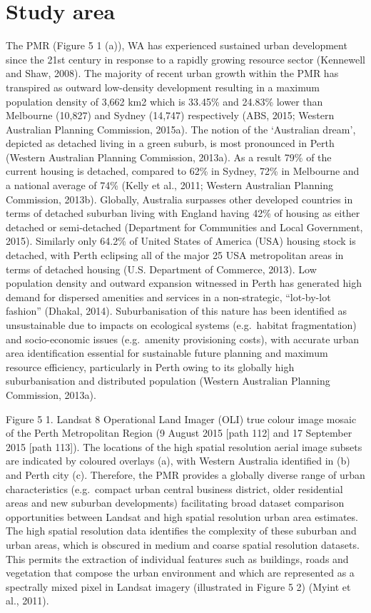 \documentclass[]{book}
\begin{document}
\section{Study area}\label{study-area}

The PMR (Figure 5 1 (a)), WA has experienced sustained urban development
since the 21st century in response to a rapidly growing resource sector
(Kennewell and Shaw, 2008). The majority of recent urban growth within
the PMR has transpired as outward low-density development resulting in a
maximum population density of 3,662 km2 which is 33.45\% and 24.83\%
lower than Melbourne (10,827) and Sydney (14,747) respectively (ABS,
2015; Western Australian Planning Commission, 2015a). The notion of the
`Australian dream', depicted as detached living in a green suburb, is
most pronounced in Perth (Western Australian Planning Commission,
2013a). As a result 79\% of the current housing is detached, compared to
62\% in Sydney, 72\% in Melbourne and a national average of 74\% (Kelly
et al., 2011; Western Australian Planning Commission, 2013b). Globally,
Australia surpasses other developed countries in terms of detached
suburban living with England having 42\% of housing as either detached
or semi-detached (Department for Communities and Local Government,
2015). Similarly only 64.2\% of United States of America (USA) housing
stock is detached, with Perth eclipsing all of the major 25 USA
metropolitan areas in terms of detached housing (U.S. Department of
Commerce, 2013). Low population density and outward expansion witnessed
in Perth has generated high demand for dispersed amenities and services
in a non-strategic, ``lot-by-lot fashion'' (Dhakal, 2014).
Suburbanisation of this nature has been identified as unsustainable due
to impacts on ecological systems (e.g.~habitat fragmentation) and
socio-economic issues (e.g.~amenity provisioning costs), with accurate
urban area identification essential for sustainable future planning and
maximum resource efficiency, particularly in Perth owing to its globally
high suburbanisation and distributed population (Western Australian
Planning Commission, 2013a).

Figure 5 1. Landsat 8 Operational Land Imager (OLI) true colour image
mosaic of the Perth Metropolitan Region (9 August 2015 {[}path 112{]}
and 17 September 2015 {[}path 113{]}). The locations of the high spatial
resolution aerial image subsets are indicated by coloured overlays (a),
with Western Australia identified in (b) and Perth city (c). Therefore,
the PMR provides a globally diverse range of urban characteristics
(e.g.~compact urban central business district, older residential areas
and new suburban developments) facilitating broad dataset comparison
opportunities between Landsat and high spatial resolution urban area
estimates. The high spatial resolution data identifies the complexity of
these suburban and urban areas, which is obscured in medium and coarse
spatial resolution datasets. This permits the extraction of individual
features such as buildings, roads and vegetation that compose the urban
environment and which are represented as a spectrally mixed pixel in
Landsat imagery (illustrated in Figure 5 2) (Myint et al., 2011).
\end{document}
